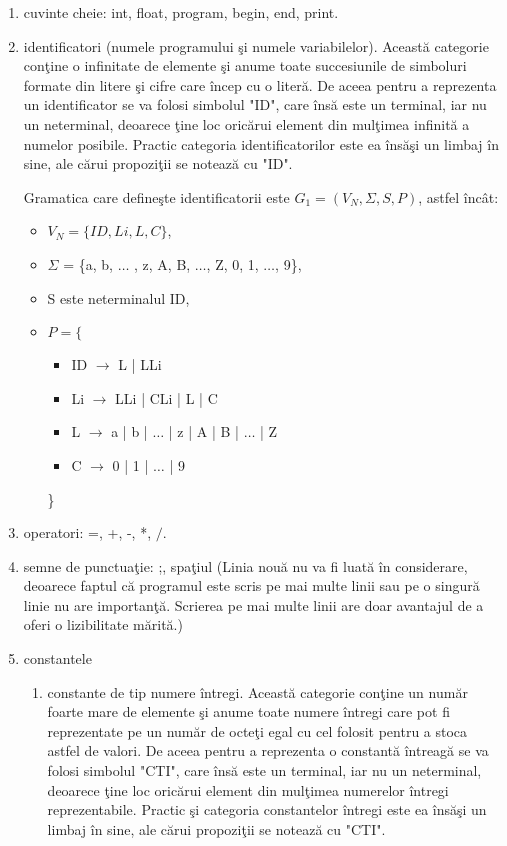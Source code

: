 \begin{enumerate}
\item
cuvinte cheie: int, float, program, begin, end, print.
\item
identificatori (numele programului şi numele variabilelor). Această categorie conţine o infinitate de elemente şi anume toate succesiunile de simboluri formate din litere şi cifre care încep cu o literă. De aceea pentru a reprezenta un identificator se va folosi simbolul "ID", care însă este un terminal, iar nu un neterminal, deoarece ţine loc oricărui element din mulţimea infinită a numelor posibile. Practic categoria identificatorilor este ea însăşi un limbaj în sine, ale cărui propoziţii se notează cu "ID".

Gramatica care defineşte identificatorii este $G_1 = (V_{N}, \Sigma, S, P)$, astfel încât:

\begin{itemize}
\item
$V_{N} = \{ID,Li,L,C\}$,
\item
$\Sigma$ = \{a, b, $\dots$ , z, A, B, $\dots$, Z, 0, 1, $\dots$, 9\},
\item
S este neterminalul ID,
\item
$P = \{$
\begin{itemize}
\item
ID $\rightarrow$ L | LLi
\item
Li $\rightarrow$ LLi | CLi | L | C
\item
L $\rightarrow$ a | b | $\dots$ | z | A | B | $\dots$ | Z
\item
C $\rightarrow$ 0 | 1 | $\dots$ | 9
\end{itemize}
\}
\end{itemize}

\item
operatori: =, +, -, *, $/$.
\item
semne de punctuaţie: ;, spaţiul (Linia nouă nu va fi luată în considerare, deoarece faptul că programul este scris pe mai multe linii sau pe o singură linie nu are importanţă. Scrierea pe mai multe linii are doar avantajul de a oferi o lizibilitate mărită.)
\item
constantele
\begin{enumerate}
\item
constante de tip numere întregi. Această categorie conţine un număr foarte mare de elemente şi anume toate numere întregi care pot fi reprezentate pe un număr de octeţi egal cu cel folosit pentru a stoca astfel de valori. De aceea pentru a reprezenta o constantă întreagă se va folosi simbolul "CTI", care însă este un terminal, iar nu un neterminal, deoarece ţine loc oricărui element din mulţimea numerelor întregi reprezentabile. Practic şi categoria constantelor întregi este ea însăşi un limbaj în sine, ale cărui propoziţii se notează cu "CTI".


\end{enumerate}
\end{enumerate}
